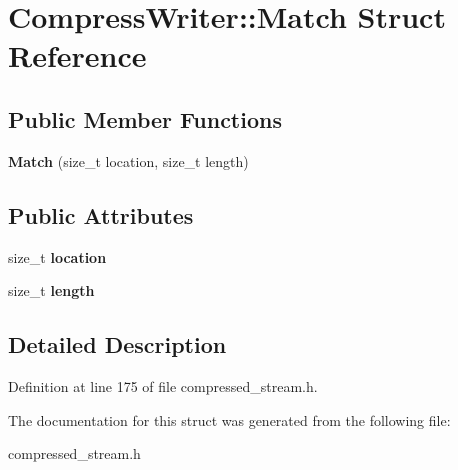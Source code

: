 \hypertarget{structCompressWriter_1_1Match}{\section{Compress\+Writer\+:\+:Match Struct Reference}
\label{structCompressWriter_1_1Match}
}
\subsection*{Public Member Functions}
\begin{DoxyCompactItemize}
\item 
\hypertarget{structCompressWriter_1_1Match_a3d6139303e8181564960d270c3b4ffd5}{{\bfseries Match} (size\+\_\+t location, size\+\_\+t length)}\label{structCompressWriter_1_1Match_a3d6139303e8181564960d270c3b4ffd5}

\end{DoxyCompactItemize}
\subsection*{Public Attributes}
\begin{DoxyCompactItemize}
\item 
\hypertarget{structCompressWriter_1_1Match_a902fb7b60d35bb8443540dda336add4a}{size\+\_\+t {\bfseries location}}\label{structCompressWriter_1_1Match_a902fb7b60d35bb8443540dda336add4a}

\item 
\hypertarget{structCompressWriter_1_1Match_aecb21869042cc75d89dfe4a58e7af34d}{size\+\_\+t {\bfseries length}}\label{structCompressWriter_1_1Match_aecb21869042cc75d89dfe4a58e7af34d}

\end{DoxyCompactItemize}


\subsection{Detailed Description}


Definition at line 175 of file compressed\+\_\+stream.\+h.



The documentation for this struct was generated from the following file\+:\begin{DoxyCompactItemize}
\item 
compressed\+\_\+stream.\+h\end{DoxyCompactItemize}
